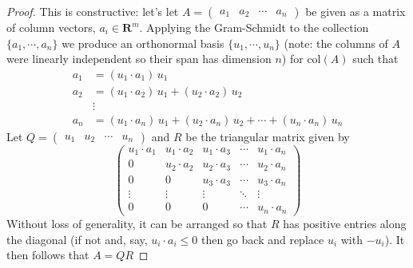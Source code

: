 \documentclass[12pt]{article}
\numberwithin{equation}{subsection}
\numberwithin{figure}{subsection}
\theoremstyle{note}
\newcommand{\R}{\mathbf{R}}
\newcommand\col[1]{\mathrm{col}(#1)}
\newcommand\m[1]{\begin{pmatrix}#1\end{pmatrix}}
\begin{document}
\begin{proof} This is constructive: let's let $A=\m{a_1 & a_2 & \cdots & a_n}$ be given as a matrix of column vectors, $a_i\in \R^m$. Applying the Gram-Schmidt to the collection $\{a_1,\cdots,a_n\}$ we produce an orthonormal basis $\{u_1,\cdots,u_n\}$ (note: the columns of $A$ were linearly independent so their span has dimension $n$) for $\col{A}$ such that 
\begin{align}
	a_1&=(u_1 \cdot a_1)\, u_1 \nonumber \\
	a_2 & =(u_1 \cdot a_2)\,u_1 + (u_2 \cdot a_2)\, u_2 \nonumber \\
	& \vdots\nonumber \\
	a_n&= (u_1 \cdot a_n)\, u_1 + (u_2 \cdot a_n)\, u_2+\cdots+ (u_n \cdot a_n)\, u_n 
\end{align}
Let $Q=\m{u_1 & u_2 & \cdots & u_n}$ and $R$ be the triangular matrix given by \begin{equation}
	\m{ u_1 \cdot a_1 & u_1 \cdot a_2 & u_1\cdot a_3 & \cdots & u_1 \cdot a_n \\
	0 & u_2 \cdot a_2 & u_2\cdot a_3 & \cdots & u_2 \cdot a_n \\
	0 & 0 &  u_3\cdot a_3 & \cdots & u_3 \cdot a_n \\
	\vdots & \vdots & \vdots & \ddots & \vdots \\
	0 & 0 & 0 & \cdots & u_n \cdot a_n}
\end{equation}
Without loss of generality, it can be arranged so that $R$ has positive entries along the diagonal (if not and, say, $u_i\cdot a_i\leq 0$ then go back and replace $u_i$ with $-u_i$). It then follows that $A=QR$\end{proof}
\end{document}
